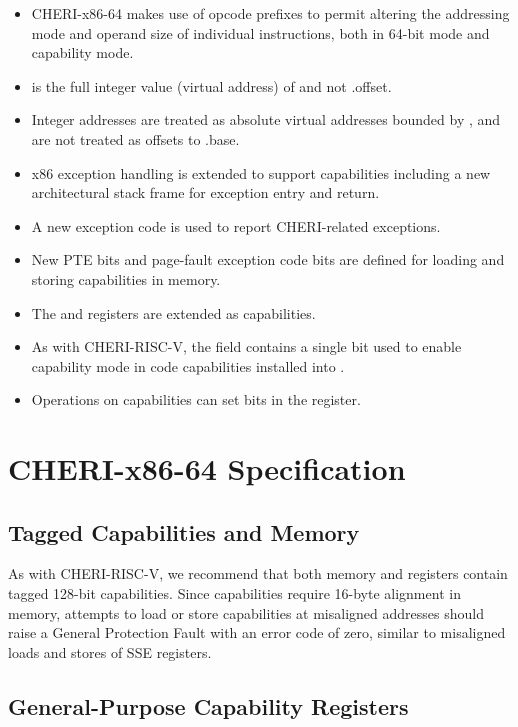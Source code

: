 \begin{itemize}
 \item CHERI-x86-64 makes use of opcode prefixes to permit altering
   the addressing mode and operand size of individual instructions,
   both in 64-bit mode and capability mode.
 \item \RIP{} is the full integer value (virtual address) of \CIP{}
   and not \CIP{}.offset.
 \item Integer addresses are treated as absolute virtual addresses
   bounded by \DDC{}, and are not treated as offsets to \DDC{}.base.
 \item x86 exception handling is extended to support capabilities
   including a new architectural stack frame for exception entry and
   return.
 \item A new exception code is used to report CHERI-related
   exceptions.
 \item New PTE bits and page-fault exception code bits are defined for
   loading and storing capabilities in memory.
 \item The \FSBASE{} and \GSBASE{} registers are extended as
   capabilities.
 \item As with CHERI-RISC-V, the \cflags{} field contains a single bit
   used to enable capability mode in code capabilities installed into
   \CIP{}.
 \item Operations on capabilities can set bits in the \RFLAGS{}
   register.
\end{itemize}

\section{CHERI-x86-64 Specification}

\subsection{Tagged Capabilities and Memory}

As with CHERI-RISC-V, we recommend that both memory and
registers contain tagged 128-bit capabilities.
Since capabilities require 16-byte alignment in memory, attempts to
load or store capabilities at misaligned addresses should raise a
General Protection Fault with an error code of zero, similar to
misaligned loads and stores of SSE registers.

\subsection{General-Purpose Capability Registers}

